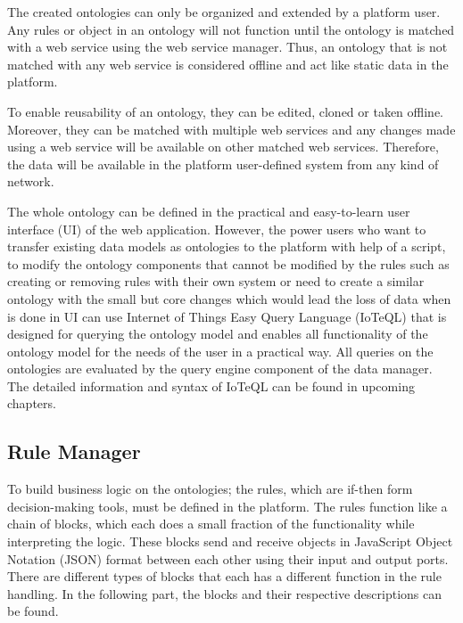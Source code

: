 The created ontologies can only be organized and extended by a platform user. Any rules or object in an ontology will not function until the ontology is matched with a web service using the web service manager. Thus, an ontology that is not matched with any web service is considered offline and act like static data in the platform.

To enable reusability of an ontology, they can be edited, cloned or taken offline. Moreover, they can be matched with multiple web services and any changes made using a web service will be available on other matched web services. Therefore, the data will be available in the platform user-defined system from any kind of network.

The whole ontology can be defined in the practical and easy-to-learn user interface (UI) of the web application. However, the power users who want to transfer existing data models as ontologies to the platform with help of a script, to modify the ontology components that cannot be modified by the rules such as creating or removing rules with their own system or need to create a similar ontology with the small but core changes which would lead the loss of data when is done in UI can use Internet of Things Easy Query Language (IoTeQL) that is designed for querying the ontology model and enables all functionality of the ontology model for the needs of the user in a practical way. All queries on the ontologies are evaluated by the query engine component of the data manager. The detailed information and syntax of IoTeQL can be found in upcoming chapters. %


\subsection{Rule Manager}
\label{ss:rule_manager}

To build business logic on the ontologies; the rules, which are if-then form decision-making tools, must be defined in the platform. The rules function like a chain of blocks, which each does a small fraction of the functionality while interpreting the logic. These blocks send and receive objects in JavaScript Object Notation (JSON) format between each other using their input and output ports. There are different types of blocks that each has a different function in the rule handling. In the following part, the blocks and their respective descriptions can be found.

